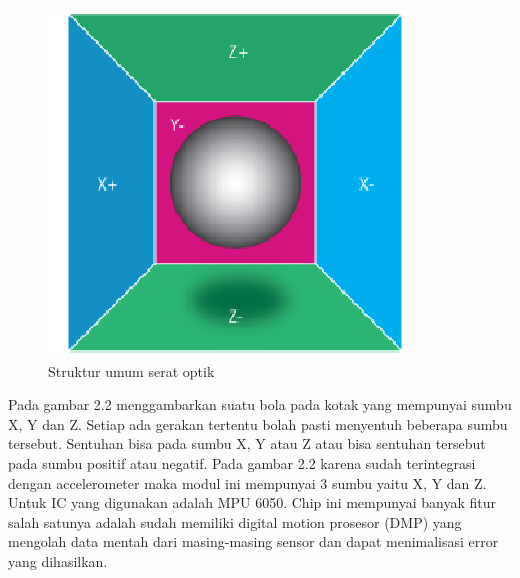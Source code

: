 \documentclass[11pt]{article}
\numberwithin{equation}{subsection}
\begin{document}
\begin{figure}[!h]
	\centering
	\captionsetup{justification=centering}
	\includegraphics[width=0.7\linewidth]{dokumentasi/MPU6050/contoh.png}
	\caption[Struktur Serat]{\small{Struktur umum serat optik}}
\end{figure}
Pada gambar 2.2 menggambarkan suatu bola pada kotak yang mempunyai sumbu X, Y dan Z. 
Setiap ada gerakan tertentu bolah pasti menyentuh beberapa sumbu tersebut.
Sentuhan bisa pada sumbu X, Y atau Z atau bisa sentuhan tersebut pada sumbu positif atau negatif.
Pada gambar 2.2 karena sudah terintegrasi dengan accelerometer maka modul ini mempunyai 3 sumbu yaitu X, Y dan Z.
Untuk IC yang digunakan adalah MPU 6050.
Chip ini mempunyai banyak fitur salah satunya adalah sudah memiliki digital motion prosesor (DMP) yang mengolah data mentah dari masing-masing sensor dan dapat menimalisasi error yang dihasilkan.
\end{document}
